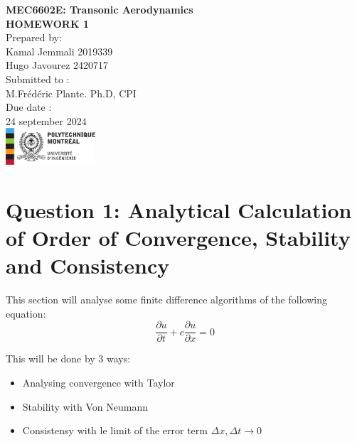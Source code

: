 \documentclass[12pt]{article}
\begin{document}
\begin{titlepage}
    \centering
    \vspace*{5cm}
    
    {\Huge \textbf{MEC6602E: Transonic Aerodynamics}}\\[1.5cm]
    
    {\Large \textbf{HOMEWORK 1}}\\[2cm]
    
    {\Large Prepared by:}\\
    {\Large Kamal Jemmali 2019339}\\
    {\Large Hugo Javourez 2420717}\\[1.5cm]
    
    {\Large Submitted to :}\\
    {\Large M.Frédéric Plante. Ph.D, CPI}\\[2cm]
    
    {\Large Due date :}\\
    {\Large 24 september 2024}\\
    
    \vfill
    \includegraphics[width=0.25\textwidth]{polytechnique-signature-rgb-gauche-fr.png} %
    
    \vfill
\end{titlepage}

\section{Question 1: Analytical Calculation of Order of Convergence, Stability and Consistency}

This section will analyse some finite difference algorithms of the following equation:
\begin{equation}
    \frac{\partial u}{\partial t} + c \frac{\partial u}{\partial x} = 0
\end{equation}

This will be done by 3 ways:

\begin{itemize}
    \item Analysing convergence with Taylor
    \item Stability with Von Neumann
    \item Consistensy with le limit of the error term $\Delta x, \Delta t \longrightarrow 0$ \\[1cm]
\end{itemize}
\end{document}
